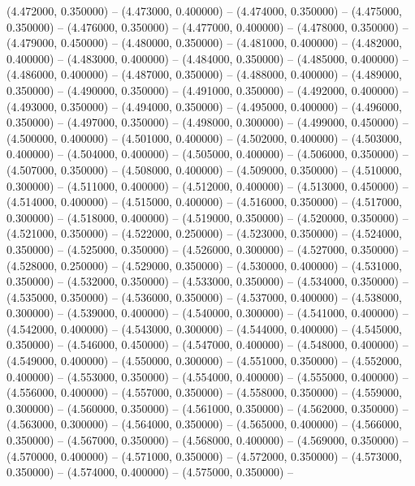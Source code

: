 (4.472000, 0.350000) -- 
(4.473000, 0.400000) -- 
(4.474000, 0.350000) -- 
(4.475000, 0.350000) -- 
(4.476000, 0.350000) -- 
(4.477000, 0.400000) -- 
(4.478000, 0.350000) -- 
(4.479000, 0.450000) -- 
(4.480000, 0.350000) -- 
(4.481000, 0.400000) -- 
(4.482000, 0.400000) -- 
(4.483000, 0.400000) -- 
(4.484000, 0.350000) -- 
(4.485000, 0.400000) -- 
(4.486000, 0.400000) -- 
(4.487000, 0.350000) -- 
(4.488000, 0.400000) -- 
(4.489000, 0.350000) -- 
(4.490000, 0.350000) -- 
(4.491000, 0.350000) -- 
(4.492000, 0.400000) -- 
(4.493000, 0.350000) -- 
(4.494000, 0.350000) -- 
(4.495000, 0.400000) -- 
(4.496000, 0.350000) -- 
(4.497000, 0.350000) -- 
(4.498000, 0.300000) -- 
(4.499000, 0.450000) -- 
(4.500000, 0.400000) -- 
(4.501000, 0.400000) -- 
(4.502000, 0.400000) -- 
(4.503000, 0.400000) -- 
(4.504000, 0.400000) -- 
(4.505000, 0.400000) -- 
(4.506000, 0.350000) -- 
(4.507000, 0.350000) -- 
(4.508000, 0.400000) -- 
(4.509000, 0.350000) -- 
(4.510000, 0.300000) -- 
(4.511000, 0.400000) -- 
(4.512000, 0.400000) -- 
(4.513000, 0.450000) -- 
(4.514000, 0.400000) -- 
(4.515000, 0.400000) -- 
(4.516000, 0.350000) -- 
(4.517000, 0.300000) -- 
(4.518000, 0.400000) -- 
(4.519000, 0.350000) -- 
(4.520000, 0.350000) -- 
(4.521000, 0.350000) -- 
(4.522000, 0.250000) -- 
(4.523000, 0.350000) -- 
(4.524000, 0.350000) -- 
(4.525000, 0.350000) -- 
(4.526000, 0.300000) -- 
(4.527000, 0.350000) -- 
(4.528000, 0.250000) -- 
(4.529000, 0.350000) -- 
(4.530000, 0.400000) -- 
(4.531000, 0.350000) -- 
(4.532000, 0.350000) -- 
(4.533000, 0.350000) -- 
(4.534000, 0.350000) -- 
(4.535000, 0.350000) -- 
(4.536000, 0.350000) -- 
(4.537000, 0.400000) -- 
(4.538000, 0.300000) -- 
(4.539000, 0.400000) -- 
(4.540000, 0.300000) -- 
(4.541000, 0.400000) -- 
(4.542000, 0.400000) -- 
(4.543000, 0.300000) -- 
(4.544000, 0.400000) -- 
(4.545000, 0.350000) -- 
(4.546000, 0.450000) -- 
(4.547000, 0.400000) -- 
(4.548000, 0.400000) -- 
(4.549000, 0.400000) -- 
(4.550000, 0.300000) -- 
(4.551000, 0.350000) -- 
(4.552000, 0.400000) -- 
(4.553000, 0.350000) -- 
(4.554000, 0.400000) -- 
(4.555000, 0.400000) -- 
(4.556000, 0.400000) -- 
(4.557000, 0.350000) -- 
(4.558000, 0.350000) -- 
(4.559000, 0.300000) -- 
(4.560000, 0.350000) -- 
(4.561000, 0.350000) -- 
(4.562000, 0.350000) -- 
(4.563000, 0.300000) -- 
(4.564000, 0.350000) -- 
(4.565000, 0.400000) -- 
(4.566000, 0.350000) -- 
(4.567000, 0.350000) -- 
(4.568000, 0.400000) -- 
(4.569000, 0.350000) -- 
(4.570000, 0.400000) -- 
(4.571000, 0.350000) -- 
(4.572000, 0.350000) -- 
(4.573000, 0.350000) -- 
(4.574000, 0.400000) -- 
(4.575000, 0.350000) -- 
